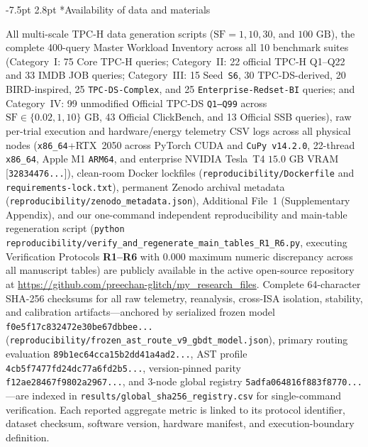 \documentclass[10pt,a4paper]{article}
\makeatletter
\renewcommand\subsection{\@startsection{subsection}{2}{\z@}%
  {-7.5pt \@plus -2pt \@minus -1pt}%
  {2.8pt \@plus 1pt}%
  {\normalfont\normalsize\bfseries}}
\makeatother
\begin{document}
\subsection*{Availability of data and materials}
{\scriptsize All multi-scale TPC-H data generation scripts ($\text{SF}=1, 10, 30$, and $100\text{ GB}$), the complete 400-query Master Workload Inventory across all 10 benchmark suites (Category~I: 75 Core TPC-H queries; Category~II: 22 official TPC-H Q1--Q22 and 33 IMDB JOB queries; Category~III: 15 Seed~\texttt{S6}, 30 TPC-DS-derived, 20 BIRD-inspired, 25 \texttt{TPC-DS-Complex}, and 25 \texttt{Enterprise-Redset-BI} queries; and Category~IV: 99 unmodified Official TPC-DS \texttt{Q1--Q99} across $\text{SF}\in\{0.02, 1, 10\}\text{ GB}$, 43 Official ClickBench, and 13 Official SSB queries), raw per-trial execution and hardware/energy telemetry CSV logs across all physical nodes (\texttt{x86\_64}+RTX~2050 across PyTorch CUDA and \texttt{CuPy v14.2.0}, 22-thread \texttt{x86\_64}, Apple M1 \texttt{ARM64}, and enterprise NVIDIA Tesla~T4 $15.0\text{ GB}$ VRAM [\texttt{32834476...}]), clean-room Docker lockfiles (\texttt{reproducibility/\allowbreak{}Dockerfile} and \texttt{requirements-\allowbreak{}lock.txt}), permanent Zenodo archival metadata (\texttt{reproducibility/\allowbreak{}zenodo\_\allowbreak{}metadata.json}), Additional File~1 (Supplementary Appendix), and our one-command independent reproducibility and main-table regeneration script (\texttt{python reproducibility/verify\_\allowbreak{}and\_\allowbreak{}regenerate\_\allowbreak{}main\_\allowbreak{}tables\_\allowbreak{}R1\_\allowbreak{}R6.py}, executing Verification Protocols \textbf{R1--R6} with $0.000$ maximum numeric discrepancy across all manuscript tables) are publicly available in the active open-source repository at \url{https://github.com/preechan-glitch/my_research_files}. Complete 64-character SHA-256 checksums for all raw telemetry, reanalysis, cross-ISA isolation, stability, and calibration artifacts---anchored by serialized frozen model \texttt{f0e5f17c832472e30be67dbbee...} (\texttt{reproducibility/\allowbreak{}frozen\_\allowbreak{}ast\_\allowbreak{}route\_\allowbreak{}v9\_\allowbreak{}gbdt\_\allowbreak{}model.json}), primary routing evaluation \texttt{89b1ec64cca15b2dd41a4ad2...}, AST profile \texttt{4cb5f7477fd24dc77a6fd2b5...}, version-pinned parity \texttt{f12ae28467f9802a2967...}, and 3-node global registry \texttt{5adfa064816f883f8770...}---are indexed in \texttt{results/\allowbreak{}global\_\allowbreak{}sha256\_\allowbreak{}registry.csv} for single-command verification. Each reported aggregate metric is linked to its protocol identifier, dataset checksum, software version, hardware manifest, and execution-boundary definition.\par}
\vspace{-5pt}
\end{document}
